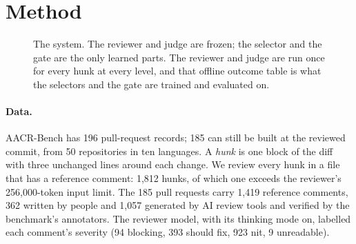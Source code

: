 \documentclass{article}
\begin{document}
\section{Method}
\begin{figure}[t]
\centering
{}
\caption{The system. The reviewer and judge are frozen; the selector and the gate are the only learned parts. The reviewer and judge are run once for every hunk at every level, and that offline outcome table is what the selectors and the gate are trained and evaluated on.}
\label{fig:system}
\end{figure}

\paragraph{Data.} AACR-Bench \citep{zhang2026aacr} has 196 pull-request records; 185 can still be built at the reviewed commit, from 50 repositories in ten languages. A \emph{hunk} is one block of the diff with three unchanged lines around each change. We review every hunk in a file that has a reference comment: 1,812 hunks, of which one exceeds the reviewer's 256,000-token input limit. The 185 pull requests carry 1,419 reference comments, 362 written by people and 1,057 generated by AI review tools and verified by the benchmark's annotators. The reviewer model, with its thinking mode on, labelled each comment's severity (94 blocking, 393 should fix, 923 nit, 9 unreadable).
\end{document}

